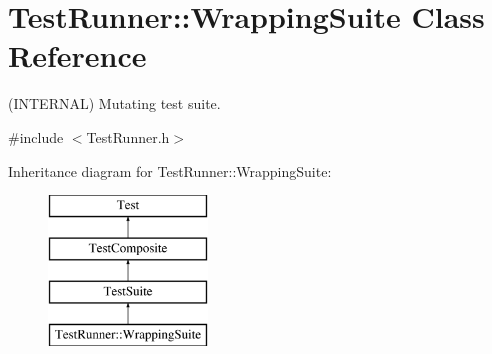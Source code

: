 \hypertarget{class_test_runner_1_1_wrapping_suite}{\section{Test\-Runner\-:\-:Wrapping\-Suite Class Reference}
\label{class_test_runner_1_1_wrapping_suite}
}


(I\-N\-T\-E\-R\-N\-A\-L) Mutating test suite.  




{\ttfamily \#include $<$Test\-Runner.\-h$>$}

Inheritance diagram for Test\-Runner\-:\-:Wrapping\-Suite\-:\begin{figure}[H]
\begin{center}
\leavevmode
\includegraphics[height=4.000000cm]{class_test_runner_1_1_wrapping_suite}
\end{center}
\end{figure}

